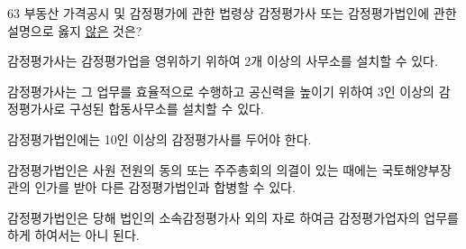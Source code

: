 \begin{question}{63}
부동산 가격공시 및 감정평가에 관한 법령상 감정평가사 또는 감정평가법인에 관한 설명으로 옳지 \uline{않은} 것은?
\begin{choices}
  \item 감정평가사는 감정평가업을 영위하기 위하여 2개 이상의 사무소를 설치할 수 있다.
  \item 감정평가사는 그 업무를 효율적으로 수행하고 공신력을 높이기 위하여 3인 이상의 감정평가사로 구성된 합동사무소를 설치할 수 있다.
  \item 감정평가법인에는 10인 이상의 감정평가사를 두어야 한다.
  \item 감정평가법인은 사원 전원의 동의 또는 주주총회의 의결이 있는 때에는 국토해양부장관의 인가를 받아 다른 감정평가법인과 합병할 수 있다.
  \item 감정평가법인은 당해 법인의 소속감정평가사 외의 자로 하여금 감정평가업자의 업무를 하게 하여서는 아니 된다.
\end{choices}
\end{question}
